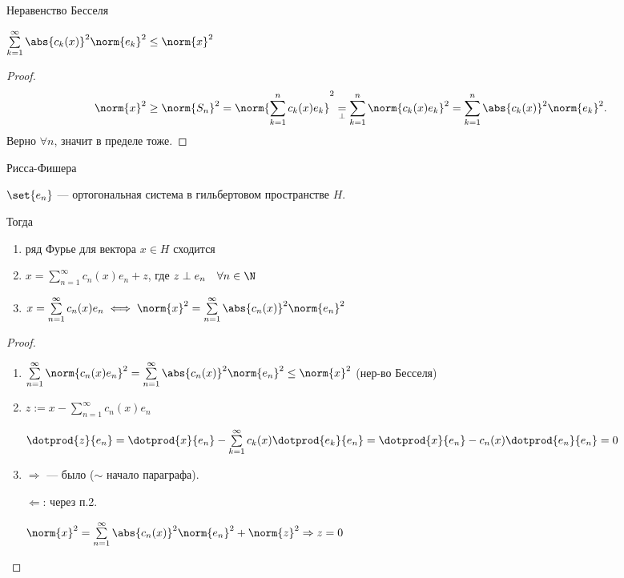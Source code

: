 \begin{consequence}{Неравенство Бесселя}

    $\sum\limits_{k=1}^\infty \abs{c_k(x)}^2 \norm{e_k}^2 \leq \norm{x}^2$

\end{consequence}
\begin{proof}
    \[
        \norm{x}^2 \geq \norm{S_n}^2 = \norm{\sum\limits_{k=1}^n c_k(x) e_k}^2 \underset{\perp}{=} \sum\limits_{k=1}^n \norm{c_k(x) e_k}^2 = \sum\limits_{k=1}^n \abs{c_k(x)}^2 \norm{e_k}^2
        .\]
    Верно $\forall n$, значит в пределе тоже.
\end{proof}

\begin{theorem}{Рисса-Фишера}

    $\set{e_n}$ --- ортогональная система в гильбертовом пространстве $H$.

    Тогда
    \begin{enumerate}
        \item ряд Фурье для вектора $x \in H$ сходится
        \item $x = \sum\limits_{n=1}^\infty c_n(x)e_n + z$, где $z \perp e_n \quad \forall n \in \N$
        \item $x = \sum\limits_{n=1}^\infty c_n(x)e_n \iff \norm{x}^2 = \sum\limits_{n=1}^\infty \abs{c_n(x)}^2 \norm{e_n}^2$
    \end{enumerate}
\end{theorem}
\begin{proof}
    \begin{enumerate}
        \item $\sum\limits_{n=1}^\infty \norm{c_n(x)e_n}^2 = \sum\limits_{n=1}^\infty \abs{c_n(x)}^2 \norm{e_n}^2 \leq \norm{x}^2$ (нер-во Бесселя)
        \item $z := x - \sum\limits_{n=1}^\infty c_n(x)e_n$

              $\dotprod{z}{e_n} = \dotprod{x}{e_n} - \sum\limits_{k=1}^\infty c_k(x) \dotprod{e_k}{e_n} = \dotprod{x}{e_n} - c_n(x) \dotprod{e_n}{e_n} = 0$
        \item $\Rightarrow$ --- было ($\sim$ начало параграфа).

              $\Leftarrow$: через п.2.

              $\norm{x}^2 = \sum\limits_{n=1}^\infty \abs{c_n(x)}^2 \norm{e_n}^2 + \norm{z}^2 \Rightarrow z = 0$
    \end{enumerate}
\end{proof}

